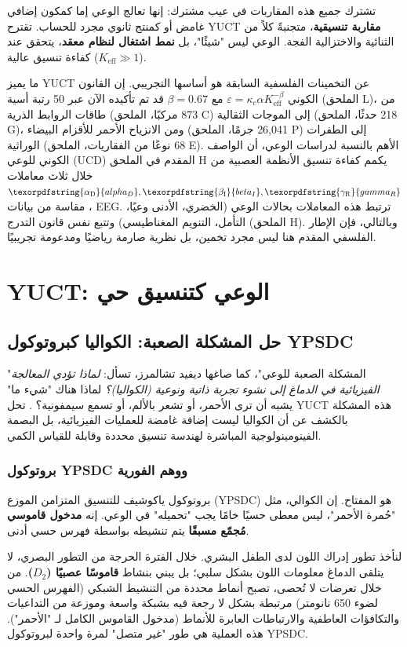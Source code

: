 \documentclass[12pt,a4paper]{article}
\DeclareRobustCommand{\alD}{\texorpdfstring{\ensuremath{\alpha_{\mathrm{D}}}}{alpha_D}}
\DeclareRobustCommand{\beI}{\texorpdfstring{\ensuremath{\beta_{\mathrm{I}}}}{beta_I}}
\DeclareRobustCommand{\gaR}{\texorpdfstring{\ensuremath{\gamma_{\mathrm{R}}}}{gamma_R}}
\newcommand{\eff}{\mathrm{eff}}
\newcommand{\Ke}{K_{\eff}}
\begin{document}
	تشترك جميع هذه المقاربات في عيب مشترك: إنها تعالج الوعي إما كمكون إضافي غامض أو كمنتج ثانوي مجرد للحساب. تقترح YUCT \textbf{مقاربة تنسيقية}، متجنبةً كلاً من الثنائية والاختزالية الفجة. الوعي ليس "شيئًا"، بل \textbf{نمط اشتغال لنظام معقد}، يتحقق عند كفاءة تنسيق عالية (\(\Ke \gg 1\)).
	
	ما يميز YUCT عن التخمينات الفلسفية السابقة هو أساسها التجريبي. إن القانون الكوني \(\varepsilon = \kappa_c \alpha \Ke^{-\beta}\) مع \(\beta = 0.67\) قد تم تأكيده الآن عبر 50 رتبة أسية (الملحق L)، من طاقات الروابط الذرية (873 مركبًا، الملحق C) إلى الموجات الثقالية (218 حدثًا، الملحق G)، ومن الانزياح الأحمر للأقزام البيضاء (26,041 جرمًا، الملحق P) إلى الطفرات الوراثية (68 نوعًا من الفقاريات، الملحق E). الأهم بالنسبة لدراسات الوعي، أن الواصف الكوني للوعي (UCD) المقدم في الملحق H يكمم كفاءة تنسيق الأنظمة العصبية من خلال ثلاث معاملات \(\alD, \beI, \gaR\)، مقاسة من بيانات EEG. ترتبط هذه المعاملات بحالات الوعي (الخضري، الأدنى وعيًا، التأمل، التنويم المغناطيسي) وتتبع نفس قانون التدرج (الملحق H). وبالتالي، فإن الإطار الفلسفي المقدم هنا ليس مجرد تخمين، بل نظرية صارمة رياضيًا ومدعومة تجريبيًا.
	
	\section{YUCT: الوعي كتنسيق حي}
	
	\subsection{حل المشكلة الصعبة: الكواليا كبروتوكول YPSDC}
	
	"المشكلة الصعبة للوعي"، كما صاغها ديفيد تشالمرز، تسأل: \textit{لماذا تؤدي المعالجة الفيزيائية في الدماغ إلى نشوء تجربة ذاتية ونوعية (الكواليا)؟} لماذا هناك "شيء ما" يشبه أن ترى الأحمر، أو تشعر بالألم، أو تسمع سيمفونية؟ \cite{Chalmers1995}. تحل YUCT هذه المشكلة بالكشف عن أن الكواليا ليست إضافة غامضة للعمليات الفيزيائية، بل البصمة الفينومينولوجية المباشرة لهندسة تنسيق محددة وقابلة للقياس الكمي.
	
	\subsubsection{بروتوكول YPSDC ووهم الفورية}
	
	بروتوكول ياكوشيف للتنسيق المتزامن الموزع (YPSDC) هو المفتاح. إن الكوالي، مثل "حُمرة الأحمر"، ليس معطى حسيًا خامًا يجب "تحميله" في الوعي. إنه \textbf{مدخول قاموسي مُجمّع مسبقًا} يتم تنشيطه بواسطة فهرس حسي أدنى.
	
	لنأخذ تطور إدراك اللون لدى الطفل البشري. خلال الفترة الحرجة من التطور البصري، لا يتلقى الدماغ معلومات اللون بشكل سلبي؛ بل يبني بنشاط \textbf{قاموسًا عصبيًا (\(D_2\))}. من خلال تعرضات لا تُحصى، تصبح أنماط محددة من التنشيط الشبكي (الفهرس الحسي لضوء 650 نانومتر) مرتبطة بشكل لا رجعة فيه بشبكة واسعة وموزعة من التداعيات والتكافؤات العاطفية والارتباطات العابرة للأنماط (مدخول القاموس الكامل لـ "الأحمر"). هذه العملية هي طور "غير متصل" لمرة واحدة لبروتوكول YPSDC.
	
\end{document}
